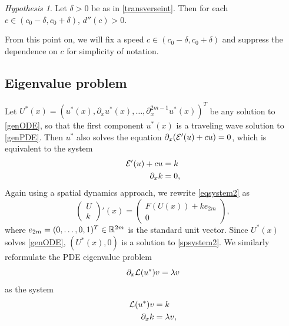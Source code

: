 \documentclass[11pt,reqno]{amsart}
\theoremstyle{plain}
\theoremstyle{definition}
\theoremstyle{remark}
\newtheorem{hypothesis}[theorem]{Hypothesis}
\begin{document}
\begin{hypothesis}\label{hyp:dccpos}
Let $\delta > 0$ be as in \cref{transverseint}. Then for each $c \in (c_0 - \delta, c_0 + \delta)$, $d''(c) > 0$.
\end{hypothesis}

\noi From this point on, we will fix a speed $c \in (c_0 - \delta, c_0 + \delta)$ and suppress the dependence on $c$ for simplicity of notation.

\subsection{Eigenvalue problem}\label{sec:EVP}

Let $U^*(x) = (u^*(x), \partial_x u^*(x), \dots, \partial_x^{2m-1}u^*(x) )^T$ be any solution to \cref{genODE}, so that the first component $u^*(x)$ is a traveling wave solution to \cref{genPDE}. Then $u^*$ also solves the equation $\partial_x(\mathcal{E}'(u) + cu) = 0$, which is equivalent to the system
\begin{equation}\label{eqsystem2}
\begin{aligned}
\mathcal{E}'(u) + cu &= k \\
\partial_x k &= 0,
\end{aligned}
\end{equation}
Again using a spatial dynamics approach, we rewrite \cref{eqsystem2} as
\begin{equation}\label{spsystem2}
\begin{pmatrix}
U \\ k
\end{pmatrix}'(x) =
\begin{pmatrix} 
F(U(x)) + k e_{2m} \\ 0
\end{pmatrix},
\end{equation}
where $e_{2m} = (0, \dots, 0, 1)^T \in \mathbb{R}^{2m}$ is the standard unit vector. Since $U^*(x)$ solves \cref{genODE}, $(U^*(x), 0)$ is a solution to \cref{spsystem2}. We similarly reformulate the PDE eigenvalue problem 
\begin{equation}\label{genPDEeig}
\partial_x \mathcal{L}(u^*) v = \lambda v
\end{equation}
as the system
\begin{equation}\label{genPDEeig2}
\begin{aligned}
\mathcal{L}(u^*) v &= k \\
\partial_x k &= \lambda v,
\end{aligned}
\end{equation}
\end{document}
